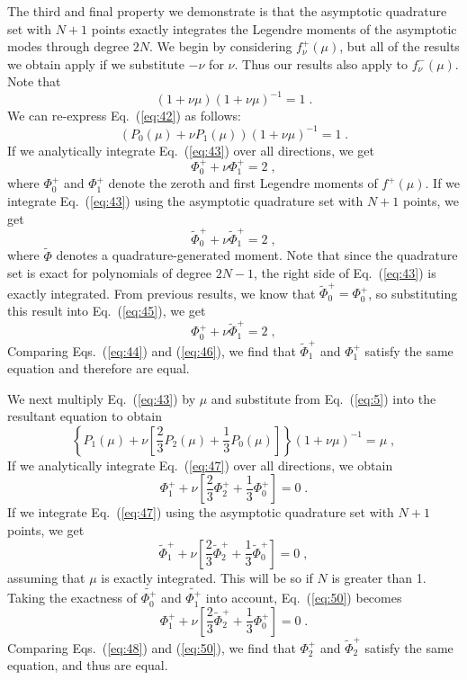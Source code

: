 \documentclass[12pt]{article}
\newcommand{\bracket}[1]{\left[ #1 \right]}
\newcommand{\bracet}[1]{\left\{ #1 \right\}}
\newcommand{\be}{\begin{equation}}
\newcommand{\ee}{\end{equation}}
\newcommand{\pec}{\; ,}
\newcommand{\pep}{\; .}
\newcommand{\LEQ}[1]{\label{eq:#1}}
\newcommand{\EQ}[1]{Eq.~(\ref{eq:#1})}
\newcommand{\REQ}[1]{\ref{eq:#1}}
\begin{document}
The third and final property we demonstrate is that the asymptotic quadrature set with $N+1$ points exactly integrates the Legendre 
moments of the asymptotic modes through degree $2N$.  We begin by considering $f^{+}_{\nu}(\mu)$, but all of the results 
we obtain apply if we substitute $-\nu$ for $\nu$.  Thus our results also apply to $f^{-}_{\nu}(\mu)$.
Note that  
\be
(1 + \nu \mu)(1 + \nu \mu)^{-1} = 1 \pep
\LEQ{42}
\ee
We can re-express \EQ{42} as follows:
\be
(P_0(\mu) + \nu P_1(\mu))(1 + \nu \mu)^{-1} = 1 \pep
\LEQ{43}
\ee
If we analytically integrate \EQ{43} over all directions, we get 
\be
\Phi^{+}_0 + \nu \Phi^{+}_1  = 2   \pec 
\LEQ{44}
\ee
where $\Phi^{+}_0$ and $\Phi^{+}_1$ denote the zeroth and first Legendre moments of $f^{+}(\mu)$.  
If we integrate \EQ{43} using the asymptotic quadrature set with $N+1$ points, we get 
\be
\tilde{\Phi}^{+}_0 + \nu \tilde{\Phi}^{+}_1  = 2   \pec 
\LEQ{45}
\ee
where $\tilde{\Phi}$ denotes a quadrature-generated moment.  Note that since the quadrature set is exact for 
polynomials of degree $2N-1$, the right side of \EQ{43} is exactly integrated.
From previous results, we know that $\tilde{\Phi}^{+}_0=\Phi^{+}_0$, so substituting this result into \EQ{45}, 
we get 
\be
\Phi^{+}_0 + \nu \tilde{\Phi}^{+}_1  = 2   \pec 
\LEQ{46}
\ee
Comparing Eqs.~(\REQ{44}) and (\REQ{46}), we find that $\tilde{\Phi}^{+}_1$ and $\Phi^{+}_1$ satisfy the same equation and 
therefore are equal.  

We next multiply \EQ{43} by $\mu$ and substitute from \EQ{5} into the resultant 
equation to obtain 
\be
\bracet{P_1(\mu) + \nu \bracket{\frac{2}{3}P_2(\mu) + \frac{1}{3} P_0(\mu)}}(1 + \nu \mu)^{-1} = \mu  \pec 
\LEQ{47}
\ee
If we analytically integrate \EQ{47} over all directions, we obtain 
\be
\Phi^{+}_1 + \nu \bracket{\frac{2}{3}\Phi^{+}_2 + \frac{1}{3} \Phi^{+}_0} = 0 \pep
\LEQ{48}
\ee
If we integrate \EQ{47} using the asymptotic quadrature set with $N+1$ points, we get
\be
\tilde{\Phi}^{+}_1 + \nu \bracket{\frac{2}{3}\tilde{\Phi}^{+}_2 + \frac{1}{3} \tilde{\Phi}^{+}_0} = 0 \pec
\LEQ{49}
\ee
assuming that $\mu$ is exactly integrated. This will be so if $N$ is greater than 1.
Taking the exactness of $\tilde{\Phi^{+}_0}$ and $\tilde{\Phi^{+}_1}$ into account, \EQ{50} becomes
\be
\Phi^{+}_1 + \nu \bracket{\frac{2}{3}\tilde{\Phi}^{+}_2 + \frac{1}{3} \Phi^{+}_0} = 0 \pep
\LEQ{50}
\ee
Comparing Eqs.~(\REQ{48}) and (\REQ{50}), we find that $\Phi^{+}_2$ and $\tilde{\Phi}^{+}_2$ satisfy the same equation, and thus are equal. 
\end{document}
